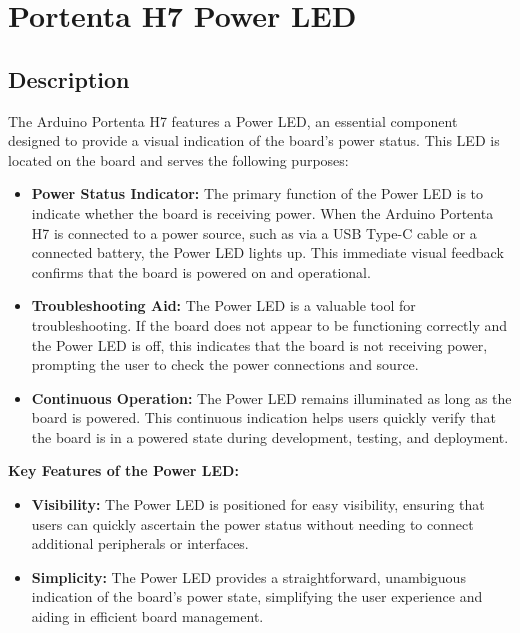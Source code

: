 \chapter{Portenta H7 Power LED}

\section{Description}

The Arduino Portenta H7 features a Power LED, an essential component designed to provide a visual indication of the board's power status. This LED is located on the board and serves the following purposes: \cite{arduino_portenta_h7_datasheet:2025}

\begin{itemize}

\item \textbf{Power Status Indicator:} The primary function of the Power LED is to indicate whether the board is receiving power. When the Arduino Portenta H7 is connected to a power source, such as via a USB Type-C cable or a connected battery, the Power LED lights up. This immediate visual feedback confirms that the board is powered on and operational.

\item \textbf{Troubleshooting Aid:} The Power LED is a valuable tool for troubleshooting. If the board does not appear to be functioning correctly and the Power LED is off, this indicates that the board is not receiving power, prompting the user to check the power connections and source.

\item \textbf{Continuous Operation:} The Power LED remains illuminated as long as the board is powered. This continuous indication helps users quickly verify that the board is in a powered state during development, testing, and deployment.

\end{itemize}

\textbf{Key Features of the Power LED:}
\begin{itemize}
	\item \textbf{Visibility:} The Power LED is positioned for easy visibility, ensuring that users can quickly ascertain the power status without needing to connect additional peripherals or interfaces. \cite{arduino_portenta_h7_datasheet:2025}
	\item \textbf{Simplicity:} The Power LED provides a straightforward, unambiguous indication of the board's power state, simplifying the user experience and aiding in efficient board management.
\end{itemize}

